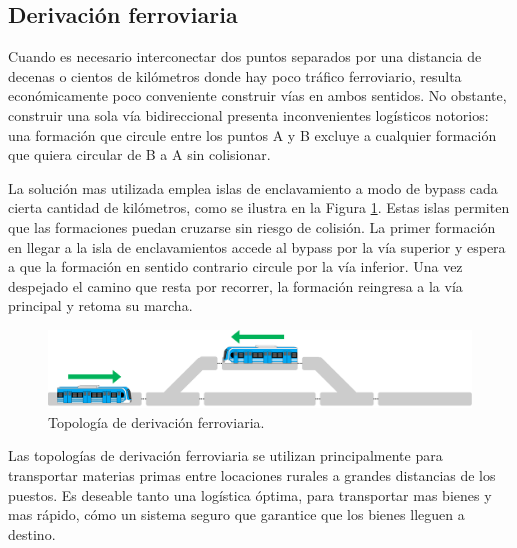 \subsection{Derivación ferroviaria}

Cuando es necesario interconectar dos puntos separados por una distancia de decenas o cientos de kilómetros donde hay poco tráfico ferroviario, resulta económicamente poco conveniente construir vías en ambos sentidos. No obstante, construir una sola vía bidireccional presenta inconvenientes logísticos notorios: una formación que circule entre los puntos A y B excluye a cualquier formación que quiera circular de B a A sin colisionar. %

La solución mas utilizada emplea islas de enclavamiento a modo de bypass cada cierta cantidad de kilómetros, como se ilustra en la Figura \ref{fig:bypass_1}. Estas islas permiten que las formaciones puedan cruzarse sin riesgo de colisión. La primer formación en llegar a la isla de enclavamientos accede al bypass por la vía superior y espera a que la formación en sentido contrario circule por la vía inferior. Una vez despejado el camino que resta por recorrer, la formación reingresa a la vía principal y retoma su marcha.

    \begin{figure}[H]
        \centering
        \includegraphics[width=1\textwidth]{Figuras/bypass}
        \centering\caption{Topología de derivación ferroviaria.}
        \label{fig:bypass_1}
    \end{figure}
    
Las topologías de derivación ferroviaria se utilizan principalmente para transportar materias primas entre locaciones rurales a grandes distancias de los puestos. Es deseable tanto una logística óptima, para transportar mas bienes y mas rápido, cómo un sistema seguro que garantice que los bienes lleguen a destino.